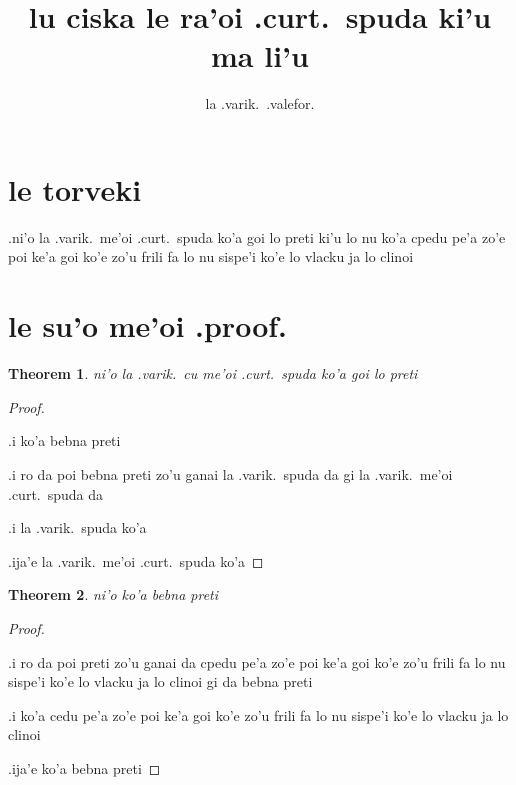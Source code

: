 \documentclass{article}
\title{lu ciska le ra'oi .curt.\ spuda ki'u ma li'u}
\author{la .varik.\ .valefor.}
\begin{document}
\newtheorem{thm}{Theorem}
\maketitle

\section{le torveki}
.ni'o la .varik.\ me'oi .curt.\ spuda ko'a goi lo preti ki'u lo nu ko'a cpedu pe'a zo'e poi ke'a goi ko'e zo'u frili fa lo nu sispe'i ko'e lo vlacku ja lo clinoi

\section{le su'o me'oi .proof.}
\begin{thm}
	ni'o la .varik.\ cu me'oi .curt.\ spuda ko'a goi lo preti
\end{thm}
\begin{proof}
	${}$

	.i ko'a bebna preti

	.i ro da poi bebna preti zo'u ganai la .varik.\ spuda da gi la .varik.\ me'oi .curt.\ spuda da

	.i la .varik.\ spuda ko'a

	.ija'e la .varik.\ me'oi .curt.\ spuda ko'a
\end{proof}

\begin{thm}
	ni'o ko'a bebna preti
\end{thm}
\begin{proof}
	${}$

	.i ro da poi preti zo'u ganai da cpedu pe'a zo'e poi ke'a goi ko'e zo'u frili fa lo nu sispe'i ko'e lo vlacku ja lo clinoi gi da bebna preti

	.i ko'a cedu pe'a zo'e poi ke'a goi ko'e zo'u frili fa lo nu sispe'i ko'e lo vlacku ja lo clinoi

	.ija'e ko'a bebna preti
\end{proof}
\end{document}
